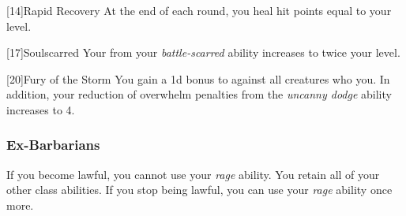             [14]{Rapid Recovery}
            At the end of each round, you heal hit points equal to your level.

            [17]{Soulscarred}
            Your  from your \textit{battle-scarred} ability increases to twice your level.

            [20]{Fury of the Storm}
            You gain a \plus1d bonus to  against all creatures who  you.
            In addition, your reduction of overwhelm penalties from the \textit{uncanny dodge} ability increases to 4.

        \subsubsection{Ex-Barbarians}
            If you become lawful, you cannot use your \textit{rage} ability.
            You retain all of your other class abilities.
            If you stop being lawful, you can use your \textit{rage} ability once more.

